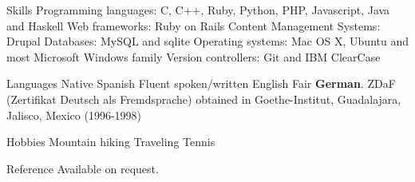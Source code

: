 \documentclass{resume}
\begin{document}
\begin{category}{Skills}
\citembullet Programming languages: C, C++, Ruby, Python, PHP, Javascript, Java and Haskell
\citembullet Web frameworks: Ruby on Rails
\citembullet Content Management Systems: Drupal
\citembullet Databases: MySQL and  sqlite
\citembullet Operating systems: Mac OS X, Ubuntu and most Microsoft Windows family
\citembullet Version controllers: Git and IBM ClearCase
\end{category}

\begin{category}{Languages}
\citembullet Native Spanish
\citembullet Fluent spoken/written English
\citembullet Fair \textbf{German}. ZDaF (Zertifikat Deutsch als Fremdsprache) obtained in Goethe-Institut, Guadalajara, Jalisco, Mexico (1996-1998)
\end{category}

\begin{category}{Hobbies}
\citembullet Mountain hiking
\citembullet Traveling
\citembullet Tennis
\end{category}

\begin{category}{Reference} 
\citemnobullet Available on request.
\end{category}
\end{document}
